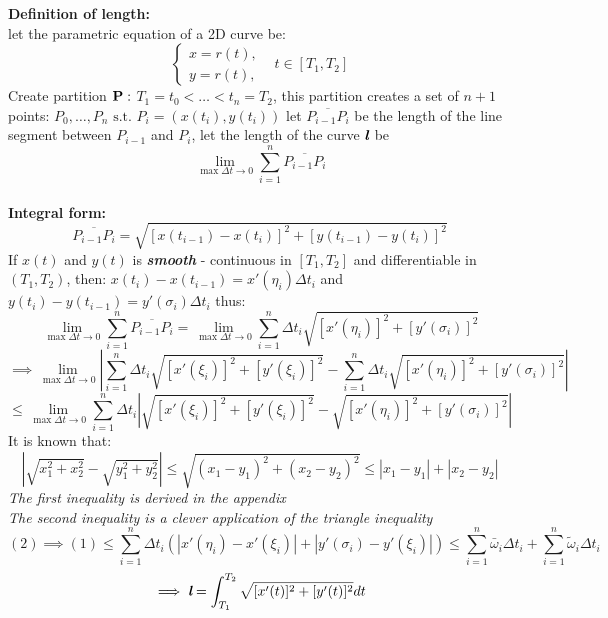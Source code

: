 \documentclass{article}
\newcommand{\st}{\mbox{ s.t. }}
\newcommand{\0}{{\bf{0}}}
\begin{document}
{\bf{Definition of length:}}\\
let the parametric equation of a 2D curve be:
$$\left\{
        \begin{array}{ll}
             x=r(t),&\\
             y=r(t),&
        \end{array}
    t\in[T_1,T_2]
    \right.$$
Create partition ${\bf{P:}}$ $T_1=t_0<\dots<t_n=T_2$, this partition creates a set of $n+1$ points: $P_0,\dots,P_n\st P_i=(x(t_i),y(t_i))$ let $\overline{P_{i-1}P_{i}}$ be the length of the line segment between $P_{i-1}$ and $P_i$, let the length of the curve $\textit{\textbf{l}}$ be $$\lim_{\max\Delta t\to0}\sum_{i=1}^n\overline{P_{i-1}P_{i}}$$\\
{\bf{Integral form:}}
$$\overline{P_{i-1}P_i}=\sqrt{[x(t_{i-1})-x(t_i)]^2+[y(t_{i-1})-y(t_i)]^2}$$
If $x(t)$ and $y(t)$ is {\textit{\textbf{smooth}}} - continuous in $[T_1,T_2]$ and differentiable in $(T_1,T_2)$, then: $x(t_i)-x(t_{i-1})=x'(\eta_i)\Delta t_i$ and $y(t_i)-y(t_{i-1})=y'(\sigma_i)\Delta t_i$ thus:
$$\lim_{\max\Delta t\to0}\sum_{i=1}^n\overline{P_{i-1}P_{i}}=\lim_{\max\Delta t\to0}\sum_{i=1}^n{\Delta}t_i\sqrt{[x'(\eta_i)]^2+[y'(\sigma_i)]^2}$$
$$\implies\lim_{\max\Delta t\to0}\left|\sum_{i=1}^n{\Delta}t_i\sqrt{[x'(\xi_i)]^2+[y'(\xi_i)]^2}-\sum_{i=1}^n{\Delta}t_i\sqrt{[x'(\eta_i)]^2+[y'(\sigma_i)]^2}\right|$$
$$\le\lim_{\max\Delta t\to0}\sum_{i=1}^n{\Delta}t_i\left|\sqrt{[x'(\xi_i)]^2+[y'(\xi_i)]^2}-\sqrt{[x'(\eta_i)]^2+[y'(\sigma_i)]^2}\right|$$
It is known that:
\begin{equation}
    |\sqrt{x_1^2+x_2^2}-\sqrt{y_1^2+y_2^2}|\le\sqrt{(x_1-y_1)^2+(x_2-y_2)^2}\le|x_1-y_1|+|x_2-y_2|
\end{equation} 
\null\hfill\textit{The first inequality is derived in the appendix\\}
\null\hfill\textit{The second inequality is a clever application of the triangle inequality}
$$(2)\implies(1)\le\sum_{i=1}^n\Delta{t_i}(|x'(\eta_i)-x'(\xi_i)|+|y'(\sigma_i)-y'(\xi_i)|)\le\sum_{i=1}^n\bar{\omega}_i\Delta{t_i}+\sum_{i=1}^n\tilde{\omega}_i\Delta{t_i}$$
$$\implies\textit{\textbf{l}}=\int_{T_1}^{T_2}\sqrt{[x'(t)]^2+[y'(t)]^2}dt$$
\end{document}
